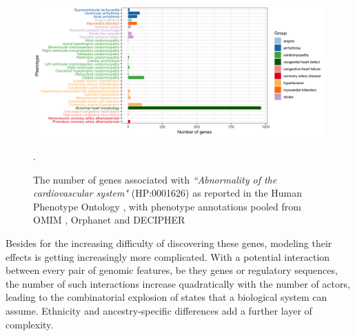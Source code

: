 \documentclass[letter]{bioinfo}
\begin{document}
	\begin{figure}[!tpb]
		\includegraphics[width=1.\linewidth]{hpo-gene-count}
		\caption{The number of genes associated with \emph{``Abnormality of the cardiovascular system"} (HP:0001626) as reported in the Human Phenotype Ontology \citep{Kohler:2014:Human},
			 with phenotype annotations pooled from OMIM \citep{McKusick:2018:OMIM} , Orphanet \citep{INSERM:1997:Orphanet}  and DECIPHER \citep{Firth:2009:DECIPHER}}.
		\label{fig:hpo_gene_count}	
	\end{figure}
	
	
	Besides for the increasing difficulty of discovering these genes, modeling their effects is getting increasingly more complicated. With a potential interaction between every pair of genomic features, be they genes or regulatory sequences, the number of such interactions increase quadratically with the number of actors, leading to the combinatorial explosion of states that a biological system can assume.  Ethnicity and ancestry-specific differences add a further layer of complexity.
	
\end{document}
